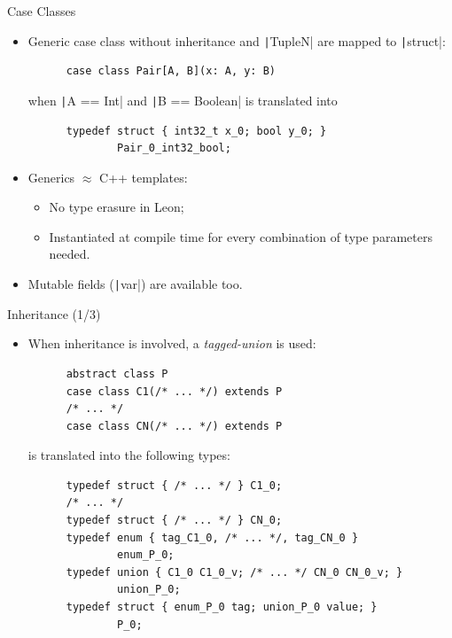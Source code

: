 \documentclass[xcolor={usenames,dvipsnames}]{beamer}
\newcommand{\InlineC}[1]{\texttt|#1|}
\newcommand{\InlineS}[1]{\texttt|#1|}
\begin{document}
\begin{frame}[fragile]{Case Classes}

  \begin{itemize}

    \item Generic case class without inheritance and \InlineS{TupleN} are mapped to \InlineC{struct}:\\
      \begin{verbatim}
      case class Pair[A, B](x: A, y: B)
      \end{verbatim}
      when \InlineS{A == Int} and \InlineS{B == Boolean} is translated into
      \begin{verbatim}
      typedef struct { int32_t x_0; bool y_0; }
              Pair_0_int32_bool;
      \end{verbatim}

    \pause \vfill

    \item Generics $\approx$ C++ templates:
      \begin{itemize}
        \item No type erasure in Leon;
        \item Instantiated at compile time for every combination of type parameters needed.
      \end{itemize}

    \pause \vfill

    \item Mutable fields (\InlineS{var}) are available too.

  \end{itemize}

\end{frame}


\begin{frame}[fragile]{Inheritance (1/3)}

  \begin{itemize}

    \item When inheritance is involved, a \emph{tagged-union} is used:
      \begin{verbatim}
      abstract class P
      case class C1(/* ... */) extends P
      /* ... */
      case class CN(/* ... */) extends P
      \end{verbatim}
      is translated into the following types:
      \begin{verbatim}
      typedef struct { /* ... */ } C1_0;
      /* ... */
      typedef struct { /* ... */ } CN_0;
      typedef enum { tag_C1_0, /* ... */, tag_CN_0 }
              enum_P_0;
      typedef union { C1_0 C1_0_v; /* ... */ CN_0 CN_0_v; }
              union_P_0;
      typedef struct { enum_P_0 tag; union_P_0 value; }
              P_0;
      \end{verbatim}

  \end{itemize}

\end{frame}
\end{document}
